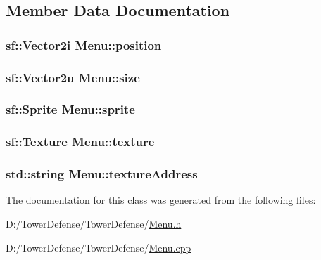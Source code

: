 \subsection{Member Data Documentation}
\hypertarget{class_menu_a5e6b181edbe72a18efff2eaa66cb97c4}{
\subsubsection[{position}]{\setlength{\rightskip}{0pt plus 5cm}sf\+::\+Vector2i Menu\+::position\hspace{0.3cm}{\ttfamily [protected]}}}\label{class_menu_a5e6b181edbe72a18efff2eaa66cb97c4}
\hypertarget{class_menu_ae43ea4415376f28f0d1c9b069614fde3}{
\subsubsection[{size}]{\setlength{\rightskip}{0pt plus 5cm}sf\+::\+Vector2u Menu\+::size\hspace{0.3cm}{\ttfamily [protected]}}}\label{class_menu_ae43ea4415376f28f0d1c9b069614fde3}
\hypertarget{class_menu_aa31afe4a4979a2c9ba427640af6e0909}{
\subsubsection[{sprite}]{\setlength{\rightskip}{0pt plus 5cm}sf\+::\+Sprite Menu\+::sprite\hspace{0.3cm}{\ttfamily [protected]}}}\label{class_menu_aa31afe4a4979a2c9ba427640af6e0909}
\hypertarget{class_menu_a9be54103b9d80fc96cdc15d29da244b8}{
\subsubsection[{texture}]{\setlength{\rightskip}{0pt plus 5cm}sf\+::\+Texture Menu\+::texture\hspace{0.3cm}{\ttfamily [protected]}}}\label{class_menu_a9be54103b9d80fc96cdc15d29da244b8}
\hypertarget{class_menu_ae5ee6080fe5aad3dbee4935320e589b6}{
\subsubsection[{texture\+Address}]{\setlength{\rightskip}{0pt plus 5cm}std\+::string Menu\+::texture\+Address\hspace{0.3cm}{\ttfamily [protected]}}}\label{class_menu_ae5ee6080fe5aad3dbee4935320e589b6}


The documentation for this class was generated from the following files\+:\begin{DoxyCompactItemize}
\item 
D\+:/\+Tower\+Defense/\+Tower\+Defense/\hyperlink{_menu_8h}{Menu.\+h}\item 
D\+:/\+Tower\+Defense/\+Tower\+Defense/\hyperlink{_menu_8cpp}{Menu.\+cpp}\end{DoxyCompactItemize}
